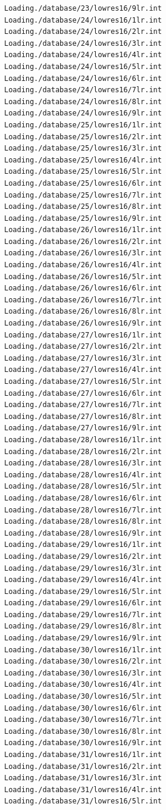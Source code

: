 \documentclass[a4paper,11pt,titlepage]{article}
\begin{document}
\begin{verbatim}
Loading./database/23/lowres16/9lr.int
Loading./database/24/lowres16/1lr.int
Loading./database/24/lowres16/2lr.int
Loading./database/24/lowres16/3lr.int
Loading./database/24/lowres16/4lr.int
Loading./database/24/lowres16/5lr.int
Loading./database/24/lowres16/6lr.int
Loading./database/24/lowres16/7lr.int
Loading./database/24/lowres16/8lr.int
Loading./database/24/lowres16/9lr.int
Loading./database/25/lowres16/1lr.int
Loading./database/25/lowres16/2lr.int
Loading./database/25/lowres16/3lr.int
Loading./database/25/lowres16/4lr.int
Loading./database/25/lowres16/5lr.int
Loading./database/25/lowres16/6lr.int
Loading./database/25/lowres16/7lr.int
Loading./database/25/lowres16/8lr.int
Loading./database/25/lowres16/9lr.int
Loading./database/26/lowres16/1lr.int
Loading./database/26/lowres16/2lr.int
Loading./database/26/lowres16/3lr.int
Loading./database/26/lowres16/4lr.int
Loading./database/26/lowres16/5lr.int
Loading./database/26/lowres16/6lr.int
Loading./database/26/lowres16/7lr.int
Loading./database/26/lowres16/8lr.int
Loading./database/26/lowres16/9lr.int
Loading./database/27/lowres16/1lr.int
Loading./database/27/lowres16/2lr.int
Loading./database/27/lowres16/3lr.int
Loading./database/27/lowres16/4lr.int
Loading./database/27/lowres16/5lr.int
Loading./database/27/lowres16/6lr.int
Loading./database/27/lowres16/7lr.int
Loading./database/27/lowres16/8lr.int
Loading./database/27/lowres16/9lr.int
Loading./database/28/lowres16/1lr.int
Loading./database/28/lowres16/2lr.int
Loading./database/28/lowres16/3lr.int
Loading./database/28/lowres16/4lr.int
Loading./database/28/lowres16/5lr.int
Loading./database/28/lowres16/6lr.int
Loading./database/28/lowres16/7lr.int
Loading./database/28/lowres16/8lr.int
Loading./database/28/lowres16/9lr.int
Loading./database/29/lowres16/1lr.int
Loading./database/29/lowres16/2lr.int
Loading./database/29/lowres16/3lr.int
Loading./database/29/lowres16/4lr.int
Loading./database/29/lowres16/5lr.int
Loading./database/29/lowres16/6lr.int
Loading./database/29/lowres16/7lr.int
Loading./database/29/lowres16/8lr.int
Loading./database/29/lowres16/9lr.int
Loading./database/30/lowres16/1lr.int
Loading./database/30/lowres16/2lr.int
Loading./database/30/lowres16/3lr.int
Loading./database/30/lowres16/4lr.int
Loading./database/30/lowres16/5lr.int
Loading./database/30/lowres16/6lr.int
Loading./database/30/lowres16/7lr.int
Loading./database/30/lowres16/8lr.int
Loading./database/30/lowres16/9lr.int
Loading./database/31/lowres16/1lr.int
Loading./database/31/lowres16/2lr.int
Loading./database/31/lowres16/3lr.int
Loading./database/31/lowres16/4lr.int
Loading./database/31/lowres16/5lr.int

\end{verbatim}
\end{document}
